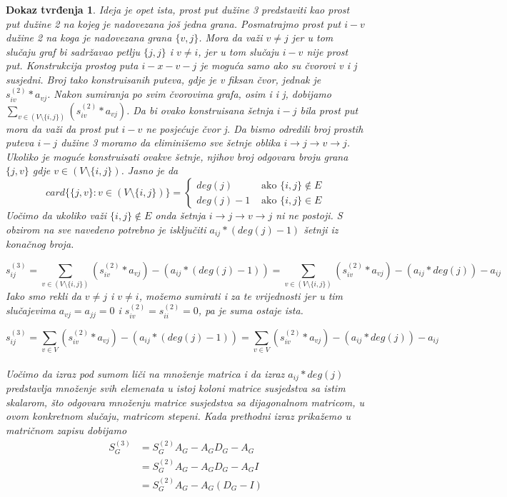 \documentclass[11pt]{article}
\newtheorem*{custom_proof}{Dokaz tvrđenja}
\begin{document}
			\begin{custom_proof}
			Ideja je opet ista, prost put dužine 3 predstaviti kao prost put dužine 2 na kojeg je nadovezana još jedna grana.
			Posmatrajmo prost put $i-v$ dužine 2 na koga je nadovezana grana $\{v,j\}$. 
			Mora da važi $v \neq j$ jer u tom slučaju graf bi sadržavao petlju $\{j,j\}$ i $v \neq i$, jer u tom slučaju $i-v$ nije prost put. 
			Konstrukcija prostog puta $i-x-v-j$ je moguća samo ako su čvorovi v i j susjedni. 
			Broj tako konstruisanih puteva, gdje je v fiksan čvor, jednak je $s_{iv}^{(2)} * a_{vj}$.
			Nakon sumiranja po svim čvorovima grafa, osim \emph{i} i \emph{j}, dobijamo $\sum_{v \in (V \setminus \{i,j\})} (s_{iv}^{(2)} * a_{vj})$.
			Da bi ovako konstruisana šetnja $i-j$ bila prost put mora da važi da prost put $i-v$ ne posjećuje čvor j. 
			Da bismo odredili broj prostih puteva $i-j$ dužine 3 moramo da eliminišemo sve šetnje oblika $i \rightarrow j \rightarrow v \rightarrow j$. 
			Ukoliko je moguće konstruisati ovakve šetnje, njihov broj odgovara broju grana $\{j,v\}$ gdje $v \in (V \setminus \{i,j\})$. Jasno je da 
			\[
				card\{\{j,v\}:  v \in (V \setminus \{i,j\})\} =
				\begin{cases}
				deg(j) & \text{ ako } \{i,j\} \notin E  \\ 
				deg(j) -1 & \text{ ako } \{i,j\} \in E   
				\end{cases} 
			\]
			Uočimo da ukoliko važi $\{i,j\} \notin E$ onda šetnja $i \rightarrow j \rightarrow v \rightarrow j$ ni ne postoji.
			S obzirom na sve navedeno potrebno je isključiti $a_{ij} * (deg(j) - 1)$ šetnji iz konačnog broja.
		
			\[
			s_{ij}^{(3)} =  \sum_{v \in (V \setminus \{i,j\})} (s_{iv}^{(2)} * a_{vj}) - (a_{ij} * (deg(j)  - 1))
				       = \sum_{v \in (V \setminus \{i,j\})} (s_{iv}^{(2)} * a_{vj}) - (a_{ij} * deg(j)) - a_{ij}
			\] 
			Iako smo rekli da $v \neq j$ i $v \neq i$, možemo sumirati i za te vrijednosti jer u tim slučajevima $a_{vj} = a_{jj} = 0$ i $s_{iv}^{(2)} = s_{ii}^{(2)} = 0$, pa je suma ostaje ista.
			
			\[
			s_{ij}^{(3)} =  \sum_{v \in V} (s_{iv}^{(2)} * a_{vj}) - (a_{ij} * (deg(j)  - 1))
				       = \sum_{v \in V} (s_{iv}^{(2)} * a_{vj}) - (a_{ij} * deg(j)) - a_{ij}
			\] 
		    \paragraph{}
			Uočimo da izraz pod sumom liči na množenje matrica i da izraz $a_{ij} * deg(j)$ predstavlja množenje svih elemenata u istoj koloni matrice susjedstva sa istim skalarom,
			što odgovara množenju matrice susjedstva sa dijagonalnom matricom, u ovom konkretnom slučaju, matricom stepeni. Kada prethodni izraz prikažemo u matričnom zapisu dobijamo
			\[
				\begin{split}
					S_G^{(3)} & = S_G^{(2)} A_G - A_G D_G - A_G \\
					& = S_G^{(2)} A_G - A_G D_G - A_G I \\
					& = S_G^{(2)} A_G - A_G (D_G - I) 
				\end{split}
				\]
				

\end{custom_proof}
\end{document}
